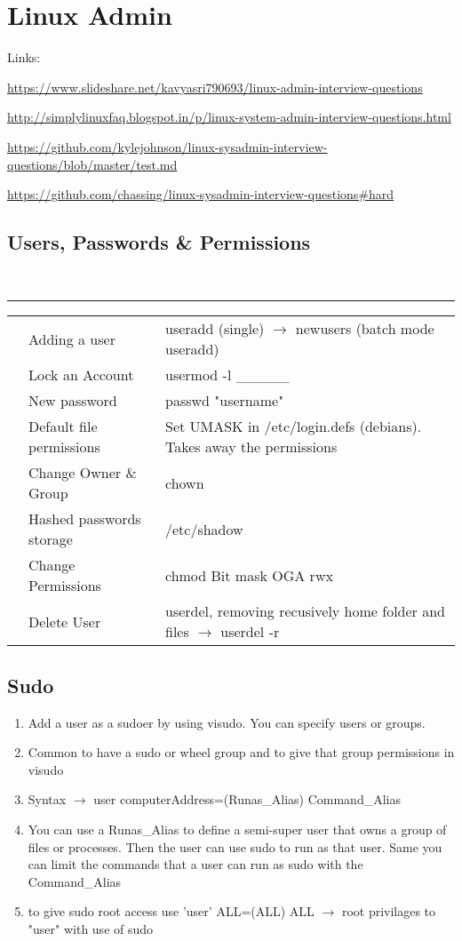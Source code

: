 \documentclass[11pt, noindent, letter]{article}
\newcommand{\ra}{$\rightarrow$ {}}
\newcommand{\blank}{\_\_\_\_\_}
\newcounter{questionSec}
\newcounter{questionCount}[questionSec]
\newcommand{\qItem}[2]{\stepcounter{questionCount} \textbf{\thequestionCount} & #1 & #2\\}
\newenvironment{questions}[1]{\bgroup
	\centering{\large\textbf{#1}}\\
	\vspace{2pt}\hrule\vspace{12pt}

	\newenvironment{questionAnswer}{
		\begin{tabular}{|p{.05\textwidth} | p{.35\textwidth}|p{.6\textwidth}|}
		\hline\hline
		\stepcounter{questionSec}
	}{\hline\end{tabular}}

	\newenvironment{answerQuestion}{

		\begin{tabular}{|p{.05\textwidth}| p{.5\textwidth} | p{.45\textwidth}|}
		\hline
		\stepcounter{questionSec}
	}{\hline\hline\end{tabular}}
}{\egroup}
\begin{document}
\renewcommand\baselinestretch{1.2}

\section{Linux Admin}
Links:

\url{https://www.slideshare.net/kavyasri790693/linux-admin-interview-questions}

\url{http://simplylinuxfaq.blogspot.in/p/linux-system-admin-interview-questions.html}

\url{https://github.com/kylejohnson/linux-sysadmin-interview-questions/blob/master/test.md}

\url{https://github.com/chassing/linux-sysadmin-interview-questions#hard}


\subsection{Users, Passwords \& Permissions}
\begin{questions}{Users}
	\begin{questionAnswer}
		\qItem{Adding a user}{useradd (single) \ra newusers (batch mode useradd)}
		\qItem{Lock an Account}{usermod -l \blank}
		\qItem{New password}{passwd "username"}
		\qItem{Default file permissions}{Set UMASK in /etc/login.defs (debians). Takes away the permissions}
		\qItem{Change Owner \& Group}{chown}
		\qItem{Hashed passwords storage}{/etc/shadow}
		\qItem{Change Permissions}{chmod Bit mask OGA rwx}
		\qItem{Delete User}{userdel, removing recusively home folder and files \ra userdel -r}
	\end{questionAnswer}
\end{questions}

\subsection{Sudo}
	\begin{enumerate}
		\item Add a user as a sudoer by using visudo. You can specify users or groups.
		\item Common to have a sudo or wheel group and to give that group permissions in visudo
		\item Syntax \ra user computerAddress=(Runas\_Alias) Command\_Alias
		\item You can use a Runas\_Alias to define a semi-super user that owns a group of files or processes. Then the user can use sudo to run as that user. Same you can limit the commands that a user can run as sudo  with the Command\_Alias
		\item to give sudo root access use 'user' ALL=(ALL) ALL \ra root privilages to "user" with use of sudo
	\end{enumerate}
\end{document}
